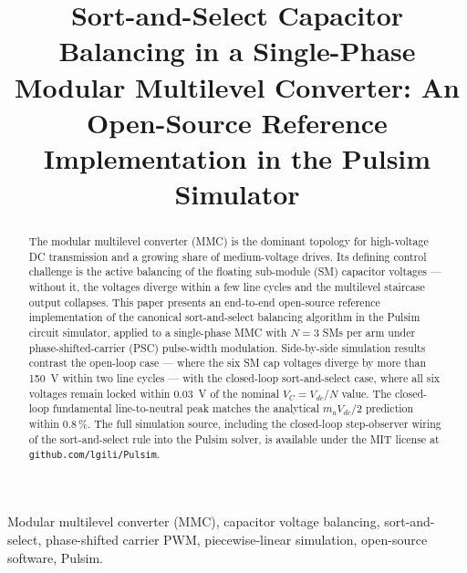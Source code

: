 \documentclass[conference, a4paper]{IEEEtran}
\begin{document}
\title{
  Sort-and-Select Capacitor Balancing in a Single-Phase Modular
  Multilevel Converter: An Open-Source Reference Implementation
  in the Pulsim Simulator
}

\author{
}

\maketitle

\begin{abstract}
The modular multilevel converter (MMC) is the dominant topology for
high-voltage DC transmission and a growing share of medium-voltage
drives. Its defining control challenge is the active balancing of
the floating sub-module (SM) capacitor voltages — without it, the
voltages diverge within a few line cycles and the multilevel
staircase output collapses. This paper presents an end-to-end
open-source reference implementation of the canonical
sort-and-select balancing algorithm in the Pulsim circuit simulator,
applied to a single-phase MMC with $N = 3$ SMs per arm under
phase-shifted-carrier (PSC) pulse-width modulation. Side-by-side
simulation results contrast the open-loop case — where the six
SM cap voltages diverge by more than 150~V within two line cycles
— with the closed-loop sort-and-select case, where all six
voltages remain locked within 0.03~V of the nominal
$V_C = V_{dc}/N$ value. The closed-loop fundamental
line-to-neutral peak matches the analytical $m_a V_{dc}/2$
prediction within $0.8\,\%$. The full simulation source,
including the closed-loop step-observer wiring of the
sort-and-select rule into the Pulsim solver, is available under
the MIT license at \texttt{github.com/lgili/Pulsim}.
\end{abstract}

\begin{IEEEkeywords}
Modular multilevel converter (MMC), capacitor voltage balancing,
sort-and-select, phase-shifted carrier PWM, piecewise-linear
simulation, open-source software, Pulsim.
\end{IEEEkeywords}
\end{document}
